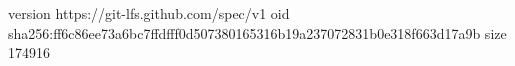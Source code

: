 version https://git-lfs.github.com/spec/v1
oid sha256:ff6c86ee73a6bc7ffdfff0d507380165316b19a237072831b0e318f663d17a9b
size 174916
